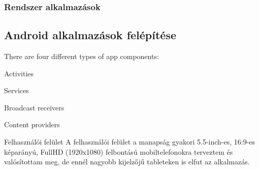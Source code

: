 \documentclass[../main.tex]{subfiles}
\begin{document}
            
        \subsubsection{Rendszer alkalmazások}
            
        
    \subsection{Android alkalmazások felépítése} %
        There are four different types of app components:

            Activities
            
            Services
            
            Broadcast receivers
            
            Content providers

        
    
        
        Felhasználói felület
        A felhasználói felület a manapság gyakori 5.5-inch-es, 16:9-es képarányú, FullHD (1920x1080) felbontású mobiltelefonokra terveztem és valósítottam meg, de ennél nagyobb kijelzőjű tableteken is elfut az alkalmazás.
        
        
\end{document}
